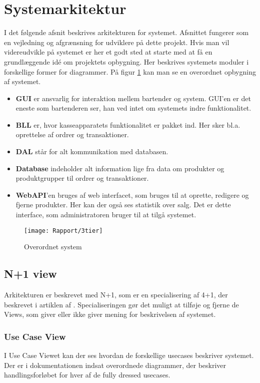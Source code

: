 \newpage
\section{Systemarkitektur}

I det følgende afsnit beskrives arkitekturen for systemet. Afsnittet fungerer som en vejledning og afgrænsning for udviklere på dette projekt. Hvis man vil videreudvikle på systemet er her et godt sted at starte med at få en grundlæggende idé om projektets opbygning. Her beskrives systemets moduler i forskellige former for diagrammer. På figur \ref{ArkiDia} kan man se en overordnet opbygning af systemet.
	
\begin{itemize}
	\item \textbf{\gls{GUI}} er ansvarlig for interaktion mellem \Gls{bartender} og \Gls{system}. \gls{GUI}'en er det eneste som \Gls{bartender}en ser, han ved intet om \gls{system}ets indre funktionalitet.
	\item \textbf{\gls{BLL}} er, hvor kasseapparatets funktionalitet er pakket ind. Her sker bl.a. oprettelse af ordrer og transaktioner.
	\item \textbf{\gls{DAL}} står for alt kommunikation med databasen.
	\item \textbf{Database} indeholder alt information lige fra data om produkter og produktgrupper til ordrer og transaktioner.
	\item \textbf{\gls{WebAPI}}'en bruges af web interfacet, som bruges til at oprette, redigere og fjerne produkter. Her kan der også ses statistik over salg. Det er dette interface, som \Gls{administrator}en bruger til at tilgå \gls{system}et.
\end{itemize}

\begin{figure}[H]
	\centering
	\texttt{[image: Rapport/3tier]}
	\caption{Overordnet system}
	\label{ArkiDia}
\end{figure}

\subsection{N+1 view}
Arkitekturen er beskrevet med N+1, som er en specialisering af 4+1, der beskrevet i artiklen af \cite{4plus1}. Specialiseringen gør det muligt at tilføje og fjerne de Views, som giver eller ikke giver mening for beskrivelsen af \gls{system}et.

\subsubsection{Use Case View}
I Use Case Viewet kan der ses hvordan de forskellige \gls{usecase}s beskriver systemet. Der er i dokumentationen indsat overordnede diagrammer, der beskriver handlingsforløbet for hver af de fully dressed \gls{usecase}s.

